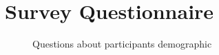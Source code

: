 \documentclass[manuscript,screen,review]{acmart}
\begin{document}
\section{Survey Questionnaire}
\begin{figure}[h]
    \caption{Questions about participants demographic}
    \label{fig:questionnaire-demographic}
\end{figure}
\end{document}
